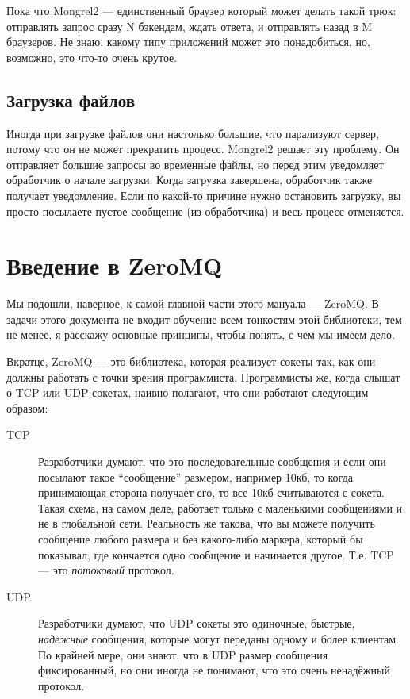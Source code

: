 Пока что Mongrel2 --- единственный браузер который может делать такой трюк:
отправлять запрос сразу N бэкендам, ждать ответа, и отправлять назад в M
браузеров. Не знаю, какому типу приложений может это понадобиться, но, возможно,
это что-то очень крутое.

\subsection{Загрузка файлов}

Иногда при загрузке файлов они настолько большие, что парализуют сервер, потому
что он не может прекратить процесс. Mongrel2 решает эту проблему. Он отправляет
большие запросы во временные файлы, но перед этим уведомляет обработчик о начале
загрузки. Когда загрузка завершена, обработчик также получает уведомление. Если
по какой-то причине нужно остановить загрузку, вы просто посылаете пустое
сообщение (из обработчика) и весь процесс отменяется.

\section{Введение в ZeroMQ}

Мы подошли, наверное, к самой главной части этого мануала ---
\href{http://zeromq.org}{ZeroMQ}. В задачи этого документа не входит обучение
всем тонкостям этой библиотеки, тем не менее, я расскажу основные принципы,
чтобы понять, с чем мы имеем дело.

Вкратце, ZeroMQ --- это библиотека, которая реализует сокеты так, как они должны
работать с точки зрения программиста. Программисты же, когда слышат о TCP или
UDP сокетах, наивно полагают, что они работают следующим образом:

\begin{description}
\item [TCP] Разработчики думают, что это последовательные сообщения и если они
    посылают такое ``сообщение'' размером, например 10кб, то когда принимающая
    сторона получает его, то все 10кб считываются с сокета. Такая схема, на самом
    деле, работает только с маленькими сообщениями и не в глобальной сети.
    Реальность же такова, что вы можете получить сообщение любого размера и без
    какого-либо маркера, который бы показывал, где кончается одно сообщение и
    начинается другое. Т.е. TCP --- это \emph{потоковый} протокол.

\item [UDP] Разработчики думают, что UDP сокеты это одиночные, быстрые,
    \emph{надёжные} сообщения, которые могут переданы одному и более клиентам. По
    крайней мере, они знают, что в UDP размер сообщения фиксированный, но они иногда
    не понимают, что это очень ненадёжный протокол.
\end{description}

